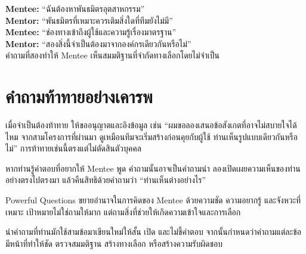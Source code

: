 \begin{examplebox}
\textbf{Mentee:} \enquote{ฉันต้องหาพันธมิตรอุตสาหกรรม}\\
\textbf{Mentor:} \enquote{พันธมิตรที่เหมาะควรเติมสิ่งใดที่ทีมยังไม่มี}\\
\textbf{Mentee:} \enquote{ช่องทางเข้าถึงผู้ใช้และความรู้เรื่องมาตรฐาน}\\
\textbf{Mentor:} \enquote{สองสิ่งนี้จำเป็นต้องมาจากองค์กรเดียวกันหรือไม่}\\
คำถามที่สองทำให้ Mentee เห็นสมมติฐานที่จำกัดทางเลือกโดยไม่จำเป็น
\end{examplebox}

\section{คำถามท้าทายอย่างเคารพ}
เมื่อจำเป็นต้องท้าทาย ให้ขออนุญาตและอิงข้อมูล เช่น \enquote{ผมขอลองเสนอข้อสังเกตที่อาจไม่สบายใจได้ไหม จากสามโครงการที่ผ่านมา ดูเหมือนทีมจะเริ่มสร้างก่อนคุยกับผู้ใช้ ท่านเห็นรูปแบบเดียวกันหรือไม่} การท้าทายเช่นนี้ตรงแต่ไม่ตัดสินตัวบุคคล

\begin{mentornote}
หากท่านรู้คำตอบที่อยากให้ Mentee พูด คำถามนั้นอาจเป็นคำถามนำ ลองเปิดเผยความเห็นของท่านอย่างตรงไปตรงมา แล้วคืนสิทธิด้วยคำถามว่า \enquote{ท่านเห็นต่างอย่างไร}
\end{mentornote}

\begin{keytakeaway}
Powerful Questions ขยายอำนาจในการคิดของ Mentee ด้วยความชัด ความอยากรู้ และจังหวะที่เหมาะ เป้าหมายไม่ใช่ถามให้มาก แต่ถามสิ่งที่ช่วยให้เกิดความเข้าใจและการเลือก
\end{keytakeaway}

\begin{reflection}
นำคำถามที่ท่านมักใช้สามข้อมาเขียนใหม่ให้สั้น เปิด และไม่ชี้คำตอบ จากนั้นกำหนดว่าคำถามแต่ละข้อมีหน้าที่ทำให้ชัด ตรวจสมมติฐาน สร้างทางเลือก หรือสร้างความรับผิดชอบ
\blankline\blankline
\end{reflection}

